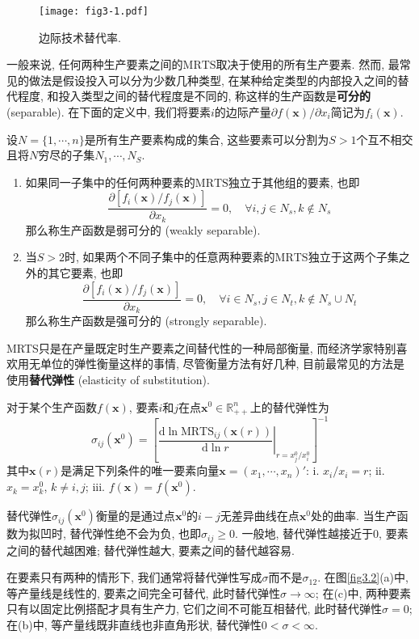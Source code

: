 \documentclass[cn, 12pt, math=mtpro2, bibstyle=apa, blue]{elegantbook}
\newcommand{\R}{\mathbb{R}}
\newcommand{\x}{\mathbf{x}}
\begin{document}
\begin{figure}[htbp!]
  \centering
  \texttt{[image: fig3-1.pdf]}
  \caption{边际技术替代率.}\label{fig3.1}
\end{figure}

一般来说, 任何两种生产要素之间的$\text{MRTS}$取决于使用的所有生产要素. 然而, 最常见的做法是假设投入可以分为少数几种类型, 在某种给定类型的内部投入之间的替代程度, 和投入类型之间的替代程度是不同的, 称这样的生产函数是\textbf{可分的} (separable). 在下面的定义中, 我们将要素$i$的边际产量$\partial f(\x)/\partial x_i$简记为$f_i(\x)$.

\begin{definition}[可分性]
设$N=\{1,\cdots,n\}$是所有生产要素构成的集合, 这些要素可以分割为$S>1$个互不相交且将$N$穷尽的子集$N_1,\cdots,N_S$.
\begin{enumerate}[label=\arabic*.]
\item 如果同一子集中的任何两种要素的$\text{MRTS}$独立于其他组的要素, 也即
$$\frac{\partial [f_i(\x)/f_j(\x)]}{\partial x_k}=0,\quad \forall i,j\in N_s, k\notin N_s$$
那么称生产函数是弱可分的 (weakly separable).
\item 当$S>2$时, 如果两个不同子集中的任意两种要素的$\text{MRTS}$独立于这两个子集之外的其它要素, 也即
$$\frac{\partial [f_i(\x)/f_j(\x)]}{\partial x_k}=0,\quad \forall i\in N_s, j\in N_t, k\notin N_s\cup N_t$$
那么称生产函数是强可分的 (strongly separable).
\end{enumerate}
\end{definition}
MRTS只是在产量既定时生产要素之间替代性的一种局部衡量, 而经济学家特别喜欢用无单位的弹性衡量这样的事情, 尽管衡量方法有好几种, 目前最常见的方法是使用\textbf{替代弹性} (elasticity of substitution).

\begin{definition}[替代弹性]
 对于某个生产函数$f(\x)$, 要素$i$和$j$在点$\x^0\in\R_{++}^n$上的替代弹性为
 $$\sigma_{ij}(\x^0)=\left[\left.\frac{\text{d}\ln\text{MRTS}_{ij}(\x(r))}{\text{d}\ln r}\right|_{r=x_j^0/x_i^0}\right]^{-1}$$
 其中$\x(r)$是满足下列条件的唯一要素向量$\x=(x_1,\cdots,x_n)'$: i. $x_i/x_i=r$; ii. $x_k=x_k^0$, $k\neq i,j$; iii. $f(\x)=f(\x^0)$.
\end{definition}
替代弹性$\sigma_{ij}(\x^0)$衡量的是通过点$\x^0$的$i-j$无差异曲线在点$\x^0$处的曲率. 当生产函数为拟凹时, 替代弹性绝不会为负, 也即$\sigma_{ij}\ge0$. 一般地, 替代弹性越接近于0, 要素之间的替代越困难; 替代弹性越大, 要素之间的替代越容易.

在要素只有两种的情形下, 我们通常将替代弹性写成$\sigma$而不是$\sigma_{12}$. 在图\ref{fig3.2}(a)中, 等产量线是线性的, 要素之间完全可替代, 此时替代弹性$\sigma\to\infty$; 在(c)中, 两种要素只有以固定比例搭配才具有生产力, 它们之间不可能互相替代, 此时替代弹性$\sigma=0$; 在(b)中, 等产量线既非直线也非直角形状, 替代弹性$0<\sigma<\infty$.
\end{document}
